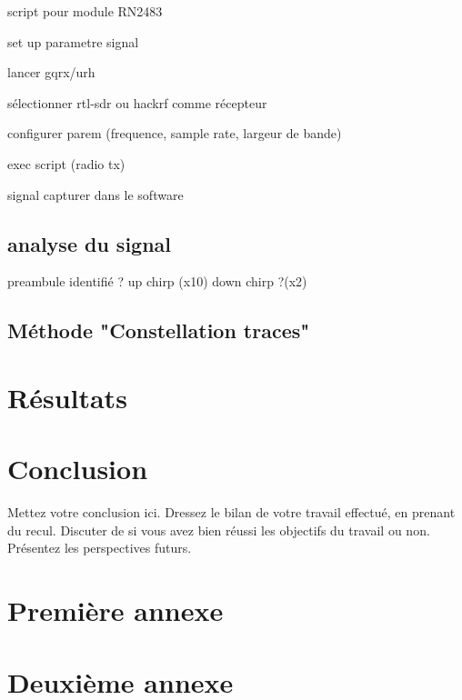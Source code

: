 \documentclass[12pt,a4paper,oneside, titlepage]{report}
\begin{document}
script pour module RN2483

set up parametre signal

lancer gqrx/urh

sélectionner rtl-sdr ou hackrf comme récepteur

configurer parem (frequence, sample rate, largeur de bande)

exec script (radio tx)

signal capturer dans le software

\section{analyse du signal}

preambule identifié ? up chirp (x10) down chirp ?(x2)

\section{Méthode "Constellation traces"}

\chapter{Résultats}





\chapter*{Conclusion}
\renewcommand{\leftmark}{CONCLUSION}

Mettez votre conclusion ici.  Dressez le bilan de votre travail effectué, en prenant du recul. Discuter de si vous avez bien réussi les objectifs du travail ou non. Présentez les perspectives futurs.






\newpage
\appendix
{}

\chapter{Premi\`ere annexe}
\renewcommand{\leftmark}{ANNEXE \thechapter.~~Premi\`ere annexe}
\label{annexe1}

\chapter{Deuxi\`eme annexe}
\renewcommand{\leftmark}{ANNEXE \thechapter.~~Deuxi\`eme annexe}
\label{annexe2}

\end{document}
